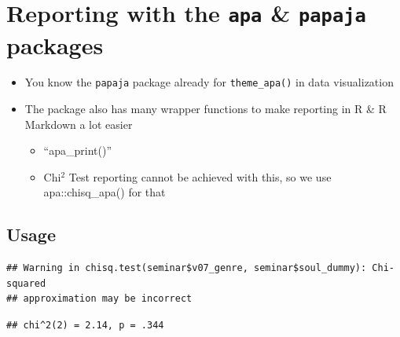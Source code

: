 \documentclass[
]{book}
\newenvironment{Shaded}{\begin{snugshade}}{\end{snugshade}}
\newcommand{\AttributeTok}[1]{\textcolor[rgb]{0.13,0.29,0.53}{#1}}
\newcommand{\CommentTok}[1]{\textcolor[rgb]{0.56,0.35,0.01}{\textit{#1}}}
\newcommand{\FunctionTok}[1]{\textcolor[rgb]{0.13,0.29,0.53}{\textbf{#1}}}
\newcommand{\NormalTok}[1]{#1}
\newcommand{\SpecialCharTok}[1]{\textcolor[rgb]{0.81,0.36,0.00}{\textbf{#1}}}
\newcommand{\StringTok}[1]{\textcolor[rgb]{0.31,0.60,0.02}{#1}}
\providecommand{\tightlist}{%
  \setlength{\itemsep}{0pt}\setlength{\parskip}{0pt}}
\begin{document}
\section{\texorpdfstring{Reporting with the \texttt{apa} \& \texttt{papaja} packages}{Reporting with the apa \& papaja packages}}\label{reporting-with-the-apa-papaja-packages}

\begin{itemize}
\tightlist
\item
  You know the \texttt{papaja} package already for \texttt{theme\_apa()} in data visualization
\item
  The package also has many wrapper functions to make reporting in R \& R Markdown a lot easier

  \begin{itemize}
  \tightlist
  \item
    ``apa\_print()''
  \item
    Chi\(^2\) Test reporting cannot be achieved with this, so we use apa::chisq\_apa() for that
  \end{itemize}
\end{itemize}

\subsection{Usage}\label{usage}

\begin{Shaded}
\end{Shaded}

\begin{verbatim}
## Warning in chisq.test(seminar$v07_genre, seminar$soul_dummy): Chi-squared
## approximation may be incorrect
\end{verbatim}

\begin{verbatim}
## chi^2(2) = 2.14, p = .344
\end{verbatim}

\begin{Shaded}
\end{Shaded}
\end{document}
